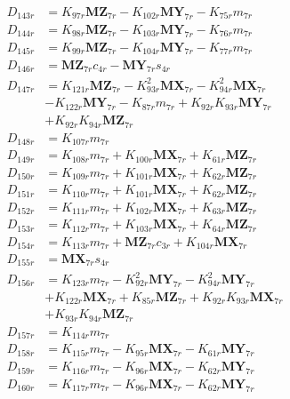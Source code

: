 \begin{align}
D_{143r} &= K_{97r}\mathbf{MZ}_{7r} - K_{102r}\mathbf{MY}_{7r} - K_{75r}m_{7r} \nonumber \\
D_{144r} &= K_{98r}\mathbf{MZ}_{7r} - K_{103r}\mathbf{MY}_{7r} - K_{76r}m_{7r} \nonumber \\
D_{145r} &= K_{99r}\mathbf{MZ}_{7r} - K_{104r}\mathbf{MY}_{7r} - K_{77r}m_{7r} \nonumber \\
D_{146r} &= \mathbf{MZ}_{7r}c_{4r} - \mathbf{MY}_{7r}s_{4r} \nonumber \\
D_{147r} &= K_{121r}\mathbf{MZ}_{7r} - K_{93r}^2\mathbf{MX}_{7r} - K_{94r}^2\mathbf{MX}_{7r}  \nonumber \\
&- K_{122r}\mathbf{MY}_{7r} - K_{87r}m_{7r} + K_{92r}K_{93r}\mathbf{MY}_{7r}  \nonumber \\
&+ K_{92r}K_{94r}\mathbf{MZ}_{7r} \nonumber \\
D_{148r} &= K_{107r}m_{7r} \nonumber \\
D_{149r} &= K_{108r}m_{7r} + K_{100r}\mathbf{MX}_{7r} + K_{61r}\mathbf{MZ}_{7r} \nonumber \\
D_{150r} &= K_{109r}m_{7r} + K_{101r}\mathbf{MX}_{7r} + K_{62r}\mathbf{MZ}_{7r} \nonumber \\
D_{151r} &= K_{110r}m_{7r} + K_{101r}\mathbf{MX}_{7r} + K_{62r}\mathbf{MZ}_{7r} \nonumber \\
D_{152r} &= K_{111r}m_{7r} + K_{102r}\mathbf{MX}_{7r} + K_{63r}\mathbf{MZ}_{7r} \nonumber \\
D_{153r} &= K_{112r}m_{7r} + K_{103r}\mathbf{MX}_{7r} + K_{64r}\mathbf{MZ}_{7r} \nonumber \\
D_{154r} &= K_{113r}m_{7r} + \mathbf{MZ}_{7r}c_{3r} + K_{104r}\mathbf{MX}_{7r} \nonumber \\
D_{155r} &= \mathbf{MX}_{7r}s_{4r} \nonumber \\
D_{156r} &= K_{123r}m_{7r} - K_{92r}^2\mathbf{MY}_{7r} - K_{94r}^2\mathbf{MY}_{7r}  \nonumber \\
&+ K_{122r}\mathbf{MX}_{7r} + K_{85r}\mathbf{MZ}_{7r} + K_{92r}K_{93r}\mathbf{MX}_{7r}  \nonumber \\
&+ K_{93r}K_{94r}\mathbf{MZ}_{7r} \nonumber \\
D_{157r} &= K_{114r}m_{7r} \nonumber \\
D_{158r} &= K_{115r}m_{7r} - K_{95r}\mathbf{MX}_{7r} - K_{61r}\mathbf{MY}_{7r} \nonumber \\
D_{159r} &= K_{116r}m_{7r} - K_{96r}\mathbf{MX}_{7r} - K_{62r}\mathbf{MY}_{7r} \nonumber \\
D_{160r} &= K_{117r}m_{7r} - K_{96r}\mathbf{MX}_{7r} - K_{62r}\mathbf{MY}_{7r} \nonumber \\

\end{align}
